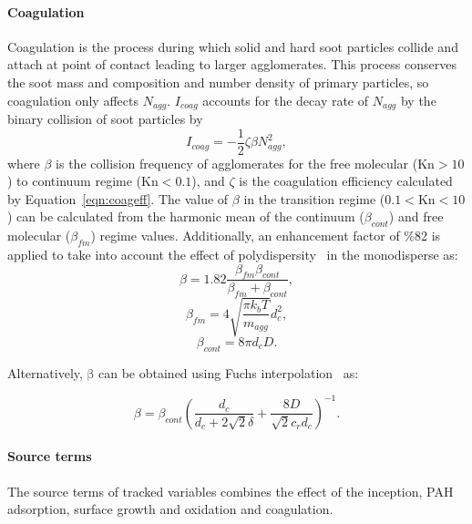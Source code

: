 \paragraph{Coagulation}
\label{sec:monocoag}
Coagulation is the process during which solid and hard soot particles collide and attach at point of contact leading to larger agglomerates. This process conserves the soot mass and composition and number density of primary particles, so coagulation only affects ${N_{agg}}$. ${I_{coag}}$ accounts for the decay rate of ${N_{agg}}$ by the binary collision of soot particles by
\begin{equation}
	I_{coag} = -\frac{1}{2}\zeta\beta N^2_{agg}
	\label{eqn:Icoag},
\end{equation}
  \noindent where ${\beta}$ is the collision frequency of agglomerates for the free molecular ($\mathrm{Kn>10}$) to continuum regime ($\mathrm{Kn<0.1}$), and $\zeta$ is the coagulation efficiency calculated by Equation~\eqref{eqn:coageff}. The value of ${\beta}$ in the transition regime ($\mathrm{0.1<Kn<10}$) can be calculated from the harmonic mean of the continuum (${\beta_{cont}}$) and free molecular (${\beta_{fm}}$) regime values. Additionally, an enhancement factor of \%82 is applied to take into account the effect of polydispersity~\citep{kelesidis2021self} in the monodisperse as:
\begin{equation}
	\beta = 1.82\frac{\beta_{fm}\beta_{cont}}{\beta_{fm}+\beta_{cont}}
	\label{eqn:betahmmono},
\end{equation}
\begin{equation}
	\beta_{fm} = 4\sqrt{\frac{\pi k_b T}{m_{agg}}} d^2_c
	\label{eqn:betafmmono},
\end{equation}
\begin{equation}
	\beta_{cont} = 8\pi d_c D
	\label{eqn:betacontmono}.
\end{equation}

 Alternatively, $\mathrm{\beta}$ can be obtained using Fuchs interpolation~\citep{fuchs1965mechanics} as:

\begin{equation}
	\beta = \beta_{cont}
	\left(
		\frac{d_c}{d_c+2\sqrt{2}\delta} +
		\frac{8D}{\sqrt{2}c_r d_c}
	\right)^{-1}
	\label{eqn:betafuchsmono}.
\end{equation}

\paragraph{Source terms}
The source terms of tracked variables combines the effect of the inception, PAH adsorption, surface growth and oxidation and coagulation.

